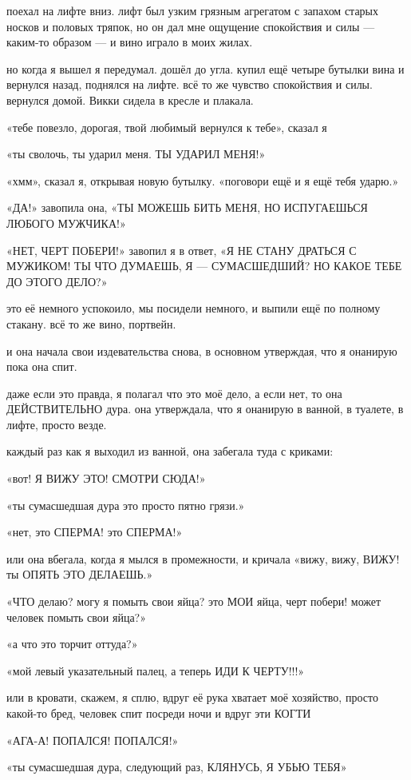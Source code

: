 поехал на лифте вниз.
лифт был узким грязным агрегатом с запахом старых 
носков и половых тряпок, но он дал мне ощущение спокойствия и силы --- каким-то 
образом --- и вино играло в моих жилах.

но когда я вышел я передумал.
дошёл до угла.
купил ещё четыре бутылки вина
и вернулся назад, поднялся на лифте.
всё то же чувство спокойствия и силы.
вернулся домой.
Викки сидела в кресле и плакала.

«тебе повезло, дорогая, твой любимый вернулся к тебе»,  сказал я

«ты сволочь, ты ударил меня.
ТЫ УДАРИЛ МЕНЯ!»

«хмм»,  сказал я, открывая новую бутылку.
«поговори ещё и я ещё тебя ударю.»

«ДА!» завопила она, «ТЫ МОЖЕШЬ БИТЬ МЕНЯ, НО ИСПУГАЕШЬСЯ ЛЮБОГО МУЖЧИКА!»

«НЕТ, ЧЕРТ ПОБЕРИ!» завопил я в ответ, «Я  НЕ  СТАНУ  ДРАТЬСЯ  С МУЖИКОМ! ТЫ  ЧТО ДУМАЕШЬ, Я --- СУМАСШЕДШИЙ?  НО  КАКОЕ ТЕБЕ ДО ЭТОГО ДЕЛО?»

это её немного успокоило, мы посидели немного, и выпили ещё по полному 
стакану.
всё то же вино, портвейн.

и она начала свои издевательства снова, в основном утверждая, что я онанирую
пока она спит.

даже если это правда, я полагал что это моё дело, а если нет, то она
ДЕЙСТВИТЕЛЬНО дура.
она утверждала, что я онанирую в ванной, в туалете, в 
лифте, просто везде.

каждый раз как я выходил из ванной, она забегала туда с криками:

«вот! Я ВИЖУ ЭТО! СМОТРИ СЮДА!»

«ты сумасшедшая дура это просто пятно грязи.»

«нет, это СПЕРМА! это СПЕРМА!»

или она вбегала, когда я мылся в промежности, и кричала «вижу, вижу, ВИЖУ! ты 
ОПЯТЬ ЭТО ДЕЛАЕШЬ.»

«ЧТО делаю? могу я помыть свои яйца? это МОИ яйца, черт побери! может
человек помыть свои яйца?»

«а что это торчит оттуда?»

«мой левый указательный палец, а теперь ИДИ К ЧЕРТУ!!!»

или в кровати, скажем, я сплю, вдруг её рука хватает моё хозяйство, 
просто какой-то бред, человек спит посреди ночи и вдруг эти КОГТИ

«АГА-А! ПОПАЛСЯ! ПОПАЛСЯ!»

«ты сумасшедшая дура, следующий раз, КЛЯНУСЬ, Я УБЬЮ ТЕБЯ»


